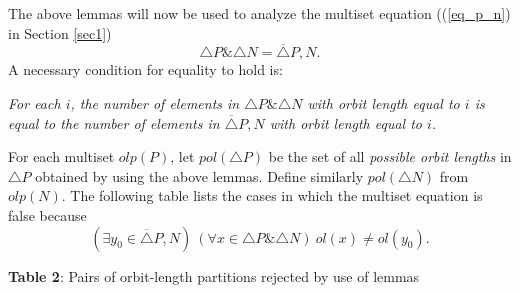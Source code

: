 {   
{\rm
The above lemmas will now be used to analyze the multiset equation ((\ref{eq_p_n}) in Section \ref{sec1})
$$\triangle P \& \triangle N = \overline{\triangle} P,N .$$
A necessary condition for equality to hold is: }

{\sl For each $i$, the number of elements in $\triangle P \& \triangle N$  
with orbit length equal to $i$ is equal to the number of elements in $\overline{\triangle} P,N$ with orbit length equal to $i$.}

{\rm
For each multiset $olp(P)$, let $pol(\triangle P)$ be the set of all {\it possible orbit lengths} in  
$\triangle P$ obtained by using the above lemmas. Define similarly  $pol(\triangle N)$ from 
$olp(N)$. The following table lists the cases in which the multiset equation is false because
$$(\exists y_{0} \in \overline{\triangle} P,N ) \ 
   (\forall x \in \triangle P \& \triangle N) \ ol(x) \neq ol(y_{0}).$$ 

\large{\bf Table 2}: \normalsize{
Pairs of orbit-length partitions rejected by use of lemmas} 

}}
